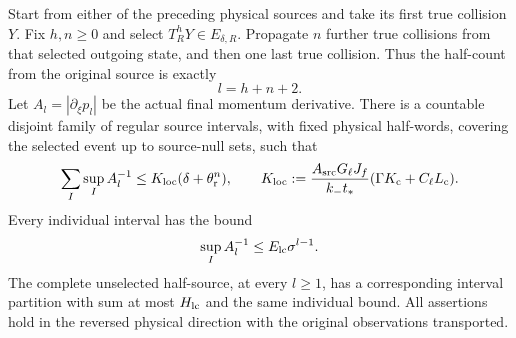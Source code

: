\begin{theorem}\label{thm:lc-local-half}
Start from either of the preceding physical sources and take its first
true collision $Y$.  Fix $h,n\ge0$ and select
$T_R^hY\in E_{\delta,R}$.  Propagate $n$ further true collisions
from that selected outgoing state, and then one last true collision.
Thus the half-count from the original source is exactly
\begin{equation}\label{eq:lc-half-index}
                         l=h+n+2.
\end{equation}
Let $A_l=|\partial_\xi p_l|$ be the actual final momentum derivative.
There is a countable disjoint family of regular source intervals,
with fixed physical half-words, covering the selected event up to
source-null sets, such that
\begin{equation}\label{eq:lc-local-half}
 \sum_I\sup_I A_l^{-1}
     \le K_{\rm loc}(\delta+\theta_{\rm r}^{n}),\qquad
 K_{\rm loc}:=
 \frac{A_{\rm src}G_\ell J_f}{k_-t_*}
                  (\Gamma K_{\rm c}+C_\ell L_{\rm c}).
\end{equation}
Every individual interval has the bound
\begin{equation}\label{eq:lc-individual}
                \sup_I A_l^{-1}\le E_{\rm lc}\sigma^{l-1}.
\end{equation}
The complete unselected half-source, at every $l\ge1$, has a
corresponding interval partition with sum at most $H_{\rm lc}$ and
the same individual bound.  All assertions hold in the reversed
physical direction with the original observations transported.
\end{theorem}
